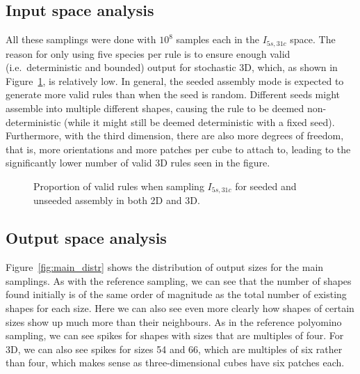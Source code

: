 \subsection{Input space analysis}
All these samplings were done with \(10^8\) samples each in the \(I_{5s,31c}\) space. The reason for only using five species per rule is to ensure enough valid (i.e.\ deterministic and bounded) output for stochastic 3D, which, as shown in Figure~\ref{fig:valid_proportion}, is relatively low. In general, the seeded assembly mode is expected to generate more valid rules than when the seed is random. Different seeds might assemble into multiple different shapes, causing the rule to be deemed non-deterministic (while it might still be deemed deterministic with a fixed seed). Furthermore, with the third dimension, there are also more degrees of freedom, that is, more orientations and more patches per cube to attach to, leading to the significantly lower number of valid 3D rules seen in the figure.

\begin{figure}[h]
    \centering
    \caption{Proportion of valid rules when sampling \(I_{5s,31c}\) for seeded and unseeded assembly in both 2D and 3D.}
    \label{fig:valid_proportion}
\end{figure}

\subsection{Output space analysis}
Figure~\ref{fig:main_distr} shows the distribution of output sizes for the main samplings. As with the reference sampling, we can see that the number of shapes found initially is of the same order of magnitude as the total number of existing shapes for each size. Here we can also see even more clearly how shapes of certain sizes show up much more than their neighbours. 
As in the reference polyomino sampling, we can see spikes for shapes with sizes that are multiples of four. For 3D, we can also see spikes for sizes 54 and 66, which are multiples of six rather than four, which makes sense as three-dimensional cubes have six patches each.

